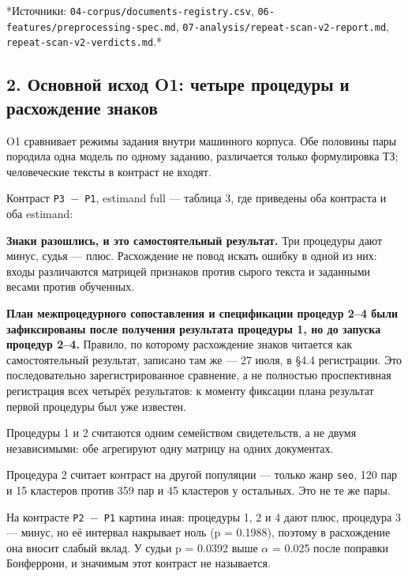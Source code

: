 \documentclass[11pt,a4paper]{article}
\renewcommand{\_}{\textunderscore\allowbreak}
\begin{document}
*Источники: \texttt{04-\allowbreak{}corpus/documents-\allowbreak{}registry.csv}, \texttt{06-\allowbreak{}features/preprocessing-\allowbreak{}spec.md},
\texttt{07-\allowbreak{}analysis/repeat-\allowbreak{}scan-\allowbreak{}v2-\allowbreak{}report.md}, \texttt{repeat-\allowbreak{}scan-\allowbreak{}v2-\allowbreak{}verdicts.md}.*

\subsection{2. Основной исход O1: четыре процедуры и расхождение знаков}

O1 сравнивает режимы задания внутри машинного корпуса. Обе половины пары породила
одна модель по одному заданию, различается только формулировка ТЗ; человеческие
тексты в контраст не входят.

Контраст \texttt{P3 $-$ P1}, estimand full — таблица 3, где приведены оба контраста
и оба estimand:

\setcounter{table}{2}


\textbf{Знаки разошлись, и это самостоятельный результат.} Три процедуры дают минус,
судья — плюс. Расхождение не повод искать ошибку в одной из них: входы
различаются матрицей признаков против сырого текста и заданными весами против
обученных.

\textbf{План межпроцедурного сопоставления и спецификации процедур 2–4 были
зафиксированы после получения результата процедуры 1, но до запуска процедур
2–4.} Правило, по которому расхождение знаков читается как самостоятельный
результат, записано там же — 27 июля, в §4.4 регистрации. Это последовательно
зарегистрированное сравнение, а не полностью проспективная регистрация всех
четырёх результатов: к моменту фиксации плана результат первой процедуры был уже
известен.

Процедуры 1 и 2 считаются одним семейством свидетельств, а не двумя независимыми:
обе агрегируют одну матрицу на одних документах.

Процедура 2 считает контраст на другой популяции — только жанр \texttt{seo}, 120 пар и
15 кластеров против 359 пар и 45 кластеров у остальных. Это не те же пары.

На контрасте \texttt{P2 $-$ P1} картина иная: процедуры 1, 2 и 4 дают плюс, процедура 3 —
минус, но её интервал накрывает ноль (p = 0.1988), поэтому в расхождение она
вносит слабый вклад. У судьи p = 0.0392 выше $\alpha$ = 0.025 после поправки Бонферрони,
и значимым этот контраст не называется.
\end{document}
